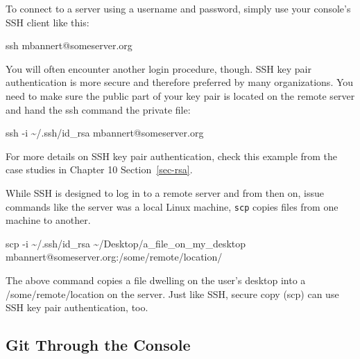 \documentclass[
  12pt,
  letterpaper,
]{krantz}
\newenvironment{Shaded}{\begin{snugshade}}{\end{snugshade}}
\newcommand{\AttributeTok}[1]{\textcolor[rgb]{0.40,0.45,0.13}{#1}}
\newcommand{\ExtensionTok}[1]{\textcolor[rgb]{0.00,0.23,0.31}{#1}}
\newcommand{\FunctionTok}[1]{\textcolor[rgb]{0.28,0.35,0.67}{#1}}
\newcommand{\NormalTok}[1]{\textcolor[rgb]{0.00,0.23,0.31}{#1}}
\begin{document}
To connect to a server using a username and password, simply use your
console's SSH client like this:

\begin{Shaded}
\begin{Highlighting}[]
\FunctionTok{ssh}\NormalTok{ mbannert@someserver.org}
\end{Highlighting}
\end{Shaded}

You will often encounter another login procedure, though. SSH
key pair authentication is more secure and therefore preferred by many
organizations. You need to make sure the public part of your key pair is
located on the remote server and hand the ssh command the private file:

\begin{Shaded}
\begin{Highlighting}[]
\FunctionTok{ssh} \AttributeTok{{-}i}\NormalTok{ \textasciitilde{}/.ssh/id\_rsa mbannert@someserver.org}
\end{Highlighting}
\end{Shaded}

For more details on SSH key pair authentication, check this
example from the case studies in Chapter 10 Section~\ref{sec-rsa}.

While SSH is designed to log in to a remote server and from
then on, issue commands like the server was a local Linux machine,
\texttt{scp} copies files from one machine to another.

\begin{Shaded}
\begin{Highlighting}[]
\FunctionTok{scp} \AttributeTok{{-}i}\NormalTok{ \textasciitilde{}/.ssh/id\_rsa \textasciitilde{}/Desktop/a\_file\_on\_my\_desktop}
 \ExtensionTok{mbannert@someserver.org:/some/remote/location/}
\end{Highlighting}
\end{Shaded}

The above command copies a file dwelling on the user's desktop into a
/some/remote/location on the server. Just like SSH, secure
copy (scp) can use SSH key pair authentication, too.

\hypertarget{git-through-the-console}{%
\subsection{Git Through the Console}\label{git-through-the-console}}
\end{document}

